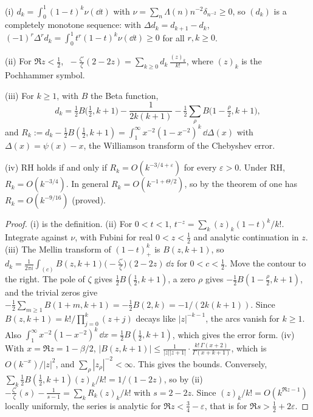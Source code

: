 \begin{theorem}\label{cw:thm:maslanka}
(i) $d_k=\int_0^1(1-t)^k\nu(\dd t)$ with $\nu=\sum_n\Lambda(n)n^{-2}\delta_{n^{-2}}\ge0$, so $(d_k)$ is a completely monotone sequence: with $\Delta d_k=d_{k+1}-d_k$, $(-1)^r\Delta^rd_k=\int_0^1t^r(1-t)^k\nu(\dd t)\ge0$ for all $r,k\ge0$.

(ii) For $\Re z<\frac12$, $\;-\frac{\zeta'}{\zeta}(2-2z)=\sum_{k\ge0}d_k\,\frac{(z)_k}{k!}$, where $(z)_k$ is the Pochhammer symbol.

(iii) For $k\ge1$, with $B$ the Beta function,
\[
d_k=\tfrac12B\big(\tfrac12,k+1\big)-\frac{1}{2k(k+1)}-\tfrac12\sum_\rho B\big(1-\tfrac\rho2,k+1\big),
\]
and $R_k:=d_k-\tfrac12B(\tfrac12,k+1)=\int_1^\infty x^{-2}(1-x^{-2})^k\,\dd\Delta(x)$ with $\Delta(x)=\psi(x)-x$, the Williamson transform of the Chebyshev error.

(iv) RH holds if and only if $R_k=O(k^{-3/4+\varepsilon})$ for every $\varepsilon>0$. Under RH, $R_k=O(k^{-3/4})$. In general $R_k=O(k^{-1+\Theta/2})$, so by the theorem of \cite{OAI26a} one has $R_k=O(k^{-9/16})$ (proved).
\end{theorem}

\begin{proof}
(i) is the definition. (ii) For $0<t<1$, $t^{-z}=\sum_k(z)_k(1-t)^k/k!$. Integrate against $\nu$, with Fubini for real $0<z<\frac12$ and analytic continuation in $z$. (iii) The Mellin transform of $(1-t)_+^k$ is $B(z,k+1)$, so $d_k=\frac1{2\pi i}\int_{(c)}B(z,k+1)\big(-\frac{\zeta'}{\zeta}\big)(2-2z)\,\dd z$ for $0<c<\frac12$. Move the contour to the right. The pole of $\zeta$ gives $\frac12B(\frac12,k+1)$, a zero $\rho$ gives $-\frac12B(1-\frac\rho2,k+1)$, and the trivial zeros give $-\frac12\sum_{m\ge1}B(1+m,k+1)=-\frac12B(2,k)=-1/(2k(k+1))$. Since $B(z,k+1)=k!/\prod_{j=0}^k(z+j)$ decays like $|z|^{-k-1}$, the arcs vanish for $k\ge1$. Also $\int_1^\infty x^{-2}(1-x^{-2})^k\,\dd x=\frac12B(\frac12,k+1)$, which gives the error form. (iv) With $x=\Re z=1-\beta/2$, $|B(z,k+1)|\le\frac1{|z||z+1|}\cdot\frac{k!\,\Gamma(x+2)}{\Gamma(x+k+1)}$, which is $O(k^{-x})/|z|^2$, and $\sum_\rho|z_\rho|^{-2}<\infty$. This gives the bounds. Conversely, $\sum_k\frac12B(\frac12,k+1)(z)_k/k!=1/(1-2z)$, so by (ii) $-\frac{\zeta'}{\zeta}(s)-\frac1{s-1}=\sum_kR_k(z)_k/k!$ with $s=2-2z$. Since $(z)_k/k!=O(k^{\Re z-1})$ locally uniformly, the series is analytic for $\Re z<\frac34-\varepsilon$, that is for $\Re s>\frac12+2\varepsilon$.
\end{proof}

